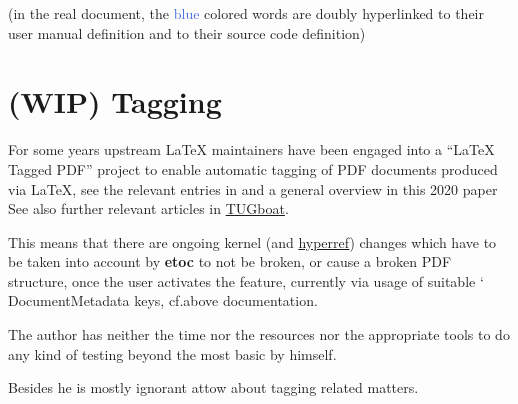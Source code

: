 \documentclass{article}
\DeclareRobustCommand\csa [1]
                {{\ttfamily\hyphenchar\font45 \char`\\ #1}}
\newcommand\etoc{%
        \texorpdfstring{{\color{joli}\ttfamily\bfseries etoc}}{etoc}\xspace}
\DeclareRobustCommand\ctanpkg[1]
      {\texorpdfstring{\href{https://ctan.org/pkg/#1}{#1}}{#1}}
\begin{document}
(in the real document, the \textcolor{RoyalBlue}{blue} colored words are
doubly hyperlinked to their user manual definition and to their source code definition)

\onehalfspacing

\section{(WIP) Tagging}
\label{etoctaggingon}
\label{etoctaggingoff}
\label{etoctagginginlineoff}

For some years upstream \LaTeX{} maintainers have been engaged into a
``\LaTeX{} Tagged PDF'' project to enable automatic tagging of PDF
documents produced via \LaTeX, see the relevant entries in
and a general overview in this 2020 paper
See also further relevant articles in \href{https://tug.org/tugboat}{TUGboat}.

This means that there are ongoing kernel (and \ctanpkg{hyperref}) changes
which have to be taken into account by \etoc to not be broken, or cause a
broken PDF structure, once the user activates the feature, currently via usage of
suitable \csa{DocumentMetadata} keys, cf.\@ above documentation.

\begingroup{}
\begin{shaded}
The author has neither the time nor the resources nor the appropriate tools to
do any kind of testing beyond the most basic by himself.

Besides he is mostly ignorant attow about tagging related matters.
\end{shaded}
\endgroup
\end{document}

